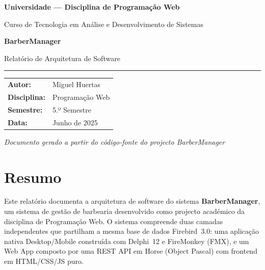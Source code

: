 \documentclass[12pt,a4paper]{article}
\begin{document}
\begin{titlepage}
  \centering
  \vspace*{2cm}

  {\Large\bfseries Universidade — Disciplina de Programação Web\par}
  \vspace{0.5cm}
  {\large Curso de Tecnologia em Análise e Desenvolvimento de Sistemas\par}

  \vfill

  {\Huge\bfseries\color{primary} BarberManager\par}
  \vspace{0.4cm}
  {\LARGE Relatório de Arquitetura de Software\par}

  \vspace{1.5cm}
  \rule{0.8\textwidth}{0.4pt}
  \vspace{1.5cm}

  \begin{tabular}{ll}
    \textbf{Autor:}       & Miguel Huertas \\[4pt]
    \textbf{Disciplina:}  & Programação Web \\[4pt]
    \textbf{Semestre:}    & 5.º Semestre \\[4pt]
    \textbf{Data:}        & Junho de 2025 \\
  \end{tabular}

  \vfill

  {\small\textit{Documento gerado a partir do código-fonte do projecto BarberManager}\par}
\end{titlepage}

\newpage
\section*{Resumo}

Este relatório documenta a arquitetura de software do sistema \textbf{BarberManager}, um sistema de gestão de barbearia desenvolvido como projecto académico da disciplina de Programação Web. O sistema compreende duas camadas independentes que partilham a mesma base de dados Firebird~3.0: uma aplicação nativa Desktop/Mobile construída com Delphi~12 e FireMonkey (FMX), e um Web App composto por uma REST API em Horse (Object Pascal) com frontend em HTML/CSS/JS puro.
\end{document}

